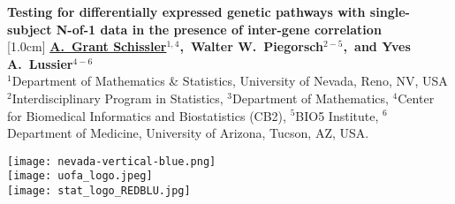 \documentclass[a0,portrait]{a0poster}
\begin{document}


\begin{minipage}[b]{0.8\linewidth}
\VeryHuge \color{NavyBlue} \textbf{Testing for differentially expressed genetic pathways with single-subject N-of-1 data in the presence of inter-gene correlation~\cite{Schissler2018}} \color{Black}\\ %
[1.0cm]
\Huge \textbf{\underline{A.~Grant Schissler$^{1,4}$},~Walter W.~Piegorsch$^{2-5}$,~and Yves A.~Lussier$^{4-6}$}\\[0.5cm] %
\huge $^{1}$Department of Mathematics \& Statistics, University of Nevada, Reno, NV, USA\\[0.4cm] %
{\huge $^{2}$Interdisciplinary Program in Statistics, $^{3}$Department of Mathematics, $^{4}$Center for Biomedical Informatics and Biostatistics (CB2), $^{5}$BIO5 Institute, $^{6}$Department of Medicine, University of Arizona, Tucson, AZ, USA}.
\end{minipage}
%
\begin{minipage}[b]{0.2\linewidth}
  \centering
  \texttt{[image: nevada-vertical-blue.png]}\\
  \texttt{[image: uofa\_logo.jpeg]}\\
  \texttt{[image: stat\_logo\_REDBLU.jpg]}\\
\end{minipage}

\vspace{0cm} %

\end{document}
